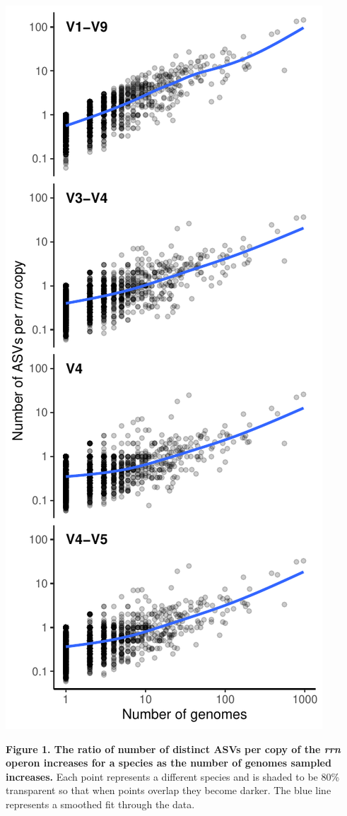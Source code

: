 \documentclass[
]{article}
\begin{document}
\newpage

\includegraphics{../figures/esv_rate.pdf}

\textbf{Figure 1. The ratio of number of distinct ASVs per copy of the
\emph{rrn} operon increases for a species as the number of genomes
sampled increases.} Each point represents a different species and is
shaded to be 80\% transparent so that when points overlap they become
darker. The blue line represents a smoothed fit through the data.
\end{document}
